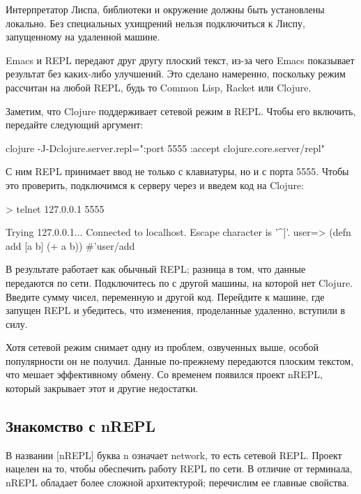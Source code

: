 Интерпретатор Лиспа, библиотеки и окружение должны быть установлены локально. Без специальных ухищрений нельзя подключиться к Лиспу, запущенному на удаленной машине.

Emacs и REPL передают друг другу плоский текст, из-за чего Emacs показывает результат без каких-либо улучшений. Это сделано намеренно, поскольку режим  рассчитан на любой REPL, будь то Common Lisp, Racket или Clojure.

Заметим, что Clojure поддерживает сетевой режим в REPL. Чтобы его включить, передайте следующий аргумент:

\begin{english}
  \begin{bash}
clojure -J-Dclojure.server.repl="{:port 5555 :accept clojure.core.server/repl}"
  \end{bash}
\end{english}

С ним REPL принимает ввод не только с клавиатуры, но и с порта 5555. Чтобы это проверить, подключимся к серверу через  и введем код на Clojure:

\begin{english}
  \begin{text}
> telnet 127.0.0.1 5555

Trying 127.0.0.1...
Connected to localhost.
Escape character is '^]'.
user=> (defn add [a b]
         (+ a b))
#'user/add
  \end{text}
\end{english}

В результате  работает как обычный REPL; разница в том, что данные передаются по сети. Подключитесь по  с другой машины, на которой нет Clojure. Введите сумму чисел, переменную и другой код. Перейдите к машине, где запущен REPL и убедитесь, что изменения, проделанные удаленно, вступили в силу.

Хотя сетевой режим снимает одну из проблем, озвученных выше, особой популярности он не получил. Данные по-прежнему передаются плоским текстом, что мешает эффективному обмену. Со временем появился проект nREPL, который закрывает этот и другие недостатки.

\subsection{Знакомство с nREPL}

\def\urlnreplorg{https://nrepl.org}

В названии \footurl{nREPL}{\urlnreplorg}[nREPL] буква n означает network, то есть сетевой REPL. Проект нацелен на то, чтобы обеспечить работу REPL по сети. В отличие от терминала, nREPL обладает более сложной архитектурой; перечислим ее главные свойства.

